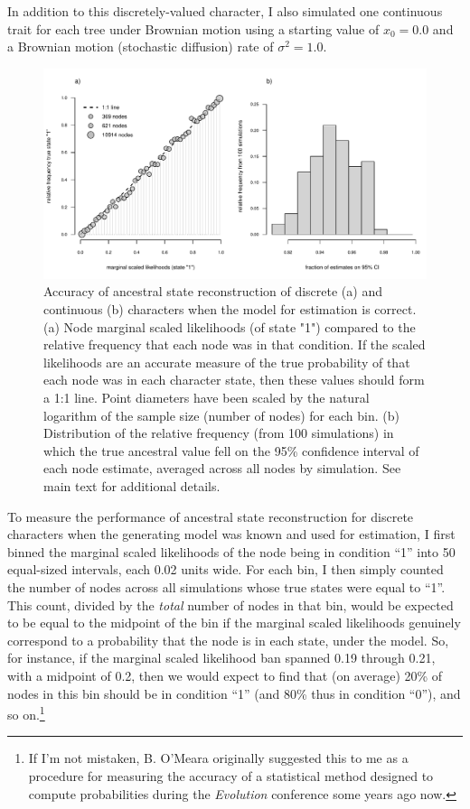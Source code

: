 \documentclass{article}
\begin{document}
In addition to this discretely-valued character, I also simulated one continuous trait for each tree under Brownian motion using a starting value of \(x_0 = 0.0\) and a Brownian motion (stochastic diffusion) rate of \(\sigma^2 = 1.0\).

\begin{figure}
\includegraphics[width=1\linewidth]{Revell.AncestralReconstruction_files/figure-latex/fig13-1} \caption{Accuracy of ancestral state reconstruction of discrete (a) and continuous (b) characters when the model for estimation is correct. (a) Node marginal scaled likelihoods (of state "1") compared to the relative frequency that each node was in that condition. If the scaled likelihoods are an accurate measure of the true probability of that each node was in each character state, then these values should form a 1:1 line. Point diameters have been scaled by the natural logarithm of the sample size (number of nodes) for each bin. (b) Distribution of the relative frequency (from 100 simulations) in which the true ancestral value fell on the 95\% confidence interval of each node estimate, averaged across all nodes by simulation. See main text for additional details.}\label{fig:fig13}
\end{figure}

To measure the performance of ancestral state reconstruction for discrete characters when the generating model was known and used for estimation, I first binned the marginal scaled likelihoods of the node being in condition ``1'' into 50 equal-sized intervals, each 0.02 units wide. For each bin, I then simply counted the number of nodes across all simulations whose true states were equal to ``1''. This count, divided by the \emph{total} number of nodes in that bin, would be expected to be equal to the midpoint of the bin if the marginal scaled likelihoods genuinely correspond to a probability that the node is in each state, under the model. So, for instance, if the marginal scaled likelihood ban spanned 0.19 through 0.21, with a midpoint of 0.2, then we would expect to find that (on average) 20\% of nodes in this bin should be in condition ``1'' (and 80\% thus in condition ``0''), and so on.\footnote{If I'm not mistaken, B. O'Meara originally suggested this to me as a procedure for measuring the accuracy of a statistical method designed to compute probabilities during the \emph{Evolution} conference some years ago now.}
\end{document}
